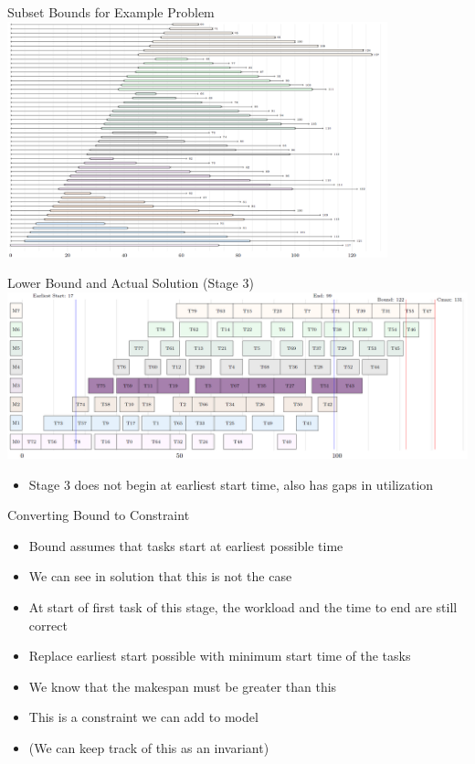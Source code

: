 \begin{frame}{Subset Bounds for Example Problem}
\includegraphics[width=11cm]{images/flowsubsetbounds.PNG}
\end{frame}

\begin{frame}{Lower Bound and Actual Solution (Stage 3)}
\includegraphics[width=14cm]{images/flowbound122scheduled.PNG}
\begin{itemize}
    \item Stage 3 does not begin at earliest start time, also has gaps in utilization
\end{itemize}
\end{frame}

\begin{frame}{Converting Bound to Constraint}
\begin{itemize}
    \item Bound assumes that tasks start at earliest possible time
    \item We can see in solution that this is not the case
    \item At start of first task of this stage, the workload and the time to end are still correct
    \item Replace earliest start possible with minimum start time of the tasks
    \item We know that the makespan must be greater than this
    \item This is a constraint we can add to model
    \item (We can keep track of this as an invariant)
\end{itemize}    
\end{frame}

